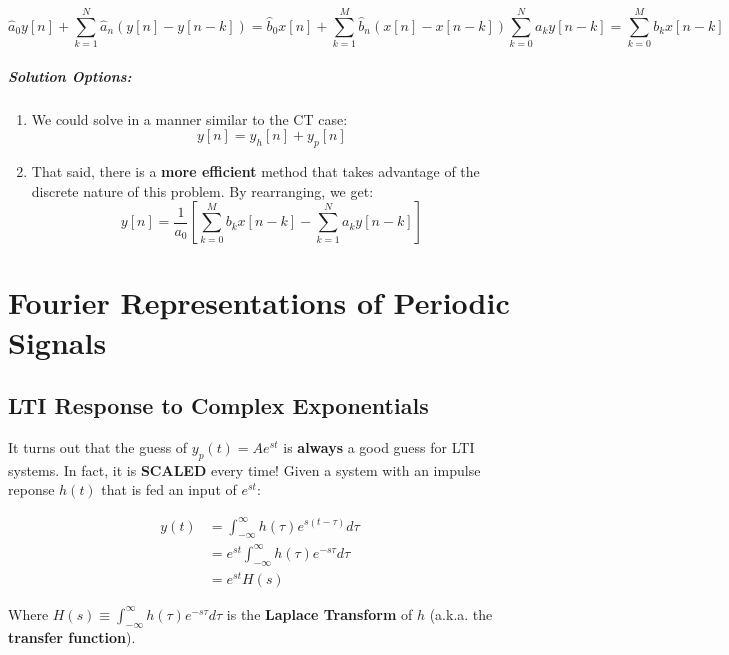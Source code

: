 \documentclass[a4paper,12pt]{report}
\begin{document}
\begin{equation}
\hat{a}_0 y[n] + \sum_{k=1}^N \hat{a}_n (y[n] - y[n-k]) = \hat{b}_0 x[n] + \sum_{k=1}^M \hat{b}_n(x[n] - x[n-k])
\sum_{k=0}^N a_k y[n-k] = \sum_{k=0}^M b_k x[n-k]
\end{equation}

\paragraph{Solution Options: } 
\begin{enumerate}
\item We could solve in a manner similar to the CT case: 
\begin{equation}
y[n] = y_h[n] + y_p[n]
\end{equation}

\item That said, there is a \textbf{more efficient} method that takes advantage of the discrete nature of this problem. By rearranging, we get: 
\begin{equation}
y[n] = \frac{1}{a_0} [\sum_{k=0}^M b_k x[n-k] - \sum_{k=1}^N a_k y[n-k]]
\end{equation}
\end{enumerate}



\chapter{Fourier Representations of Periodic Signals}

\section{LTI Response to Complex Exponentials}

It turns out that the guess of $y_p(t) = Ae^{st}$ is \textbf{always} a good guess for LTI systems. In fact, it is \textbf{SCALED} every time! Given a system with an impulse reponse $h(t)$ that is fed an input of $e^{st}$: 

\begin{equation}
\begin{split}
y(t) &= \int_{-\infty}^{\infty} h(\tau) e^{s(t-\tau)} d\tau \\
&= e^{st} \int_{-\infty}^\infty h(\tau) e^{-s\tau} d\tau \\
&= e^{st} H(s)
\end{split}
\end{equation}

Where $H(s) \equiv \int_{-\infty}^\infty h(\tau) e^{-s\tau} d\tau$ is the \textbf{Laplace Transform} of $h$ (a.k.a. the \textbf{transfer function}).
\end{document}
